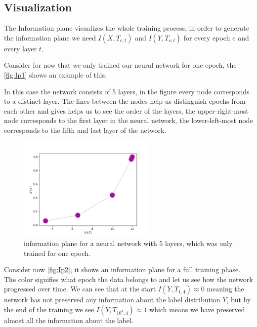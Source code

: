 \documentclass[dissertation.tex]{subfiles}
\begin{document}
\subsection{Visualization}

The Information plane visualizes the whole training process, in order to
generate the information plane we need $I(X,T_{e,t})$ and $I(Y,T_{e,t})$ for every
epoch $e$ and every layer $t$.

Consider for now that we only trained our neural network for one epoch, the
\autoref{fig:Ip1} shows an example of this. 

In this case the network consists of 5 layers, in the figure every node
corresponds to a distinct layer. The lines between the nodes help us distinguish
epochs from each other and gives helps us to see the order of the layers, the
upper-right-most node corresponds to the first layer in the neural network, the
lower-left-most node corresponds to the fifth and last layer of the network.

\begin{figure}[H]
  \centering
  \includegraphics[width=0.60\textwidth]{figs/ip_1v2.png}
  \caption{
    information plane for a neural network with 5 layers, which was only trained
    for one epoch.
  }
  \label{fig:Ip1}
\end{figure}

Consider now \autoref{fig:Ip2}, it shows an information plane for a full
training phase. The color signifies what epoch the data belongs to and let us
see how the network progressed over time. We can see that at the start $I(Y,
T_{1,4}) \approx 0$ meaning the network has not preserved any information about
the label distribution $Y$, but by the end of the training we see $I(Y,
T_{10^4,4}) \approx 1$ which means we have preserved almost all the information
about the label.
\end{document}
